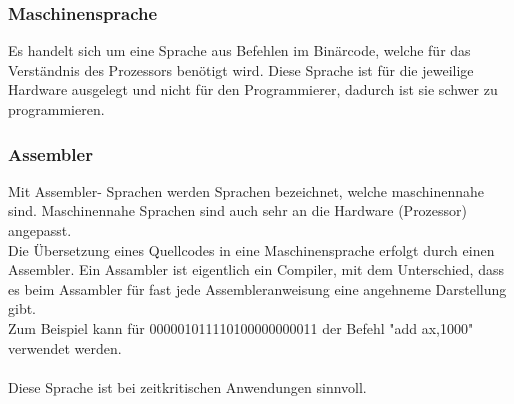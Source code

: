 \documentclass[12pt,a4paper]{report}
\begin{document}
\subsubsection{Maschinensprache}
Es handelt sich um eine Sprache aus Befehlen im Binärcode, welche für das Verständnis des Prozessors benötigt wird. Diese Sprache ist für die jeweilige Hardware ausgelegt und nicht für den Programmierer, dadurch ist sie schwer zu programmieren.

\subsubsection{Assembler}
Mit Assembler- Sprachen werden Sprachen bezeichnet, welche maschinennahe sind. Maschinennahe Sprachen sind auch sehr an die Hardware (Prozessor) angepasst.\\
Die Übersetzung eines Quellcodes in eine Maschinensprache erfolgt durch einen Assembler. Ein Assambler ist eigentlich ein Compiler, mit dem Unterschied, dass es beim Assambler für fast jede Assembleranweisung eine angehneme Darstellung gibt.
\\Zum Beispiel kann für 000001011110100000000011 der Befehl "{}add ax,1000"{} verwendet werden.\\
\\Diese Sprache ist bei zeitkritischen Anwendungen sinnvoll.
\end{document}
